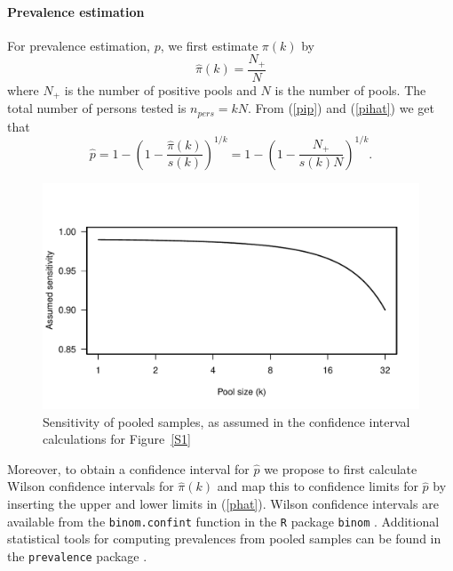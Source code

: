 \documentclass[10pt]{article}
\begin{document}
\paragraph*{Prevalence estimation}
For prevalence estimation, $p$,  we first  estimate $\pi(k)$ by 
\begin{equation}
\label{pihat}
\hat{\pi}(k)=\frac{N_{+}}{N}
\end{equation}
where $N_{+}$  is the number of positive pools and $N$ is the number of pools.  The total number of persons tested is $n_{pers}=kN$. From (\ref{pip})  and (\ref{pihat}) we get that 
\begin{equation}
\label{phat}
\hat{p}=1-\left(1-\frac{\hat{\pi}(k)}{s(k)}\right)^{1/k}=1-\left(1-\frac{N_+}{s(k)N}\right)^{1/k}.
\end{equation}
\begin{figure}[!hbt]
\begin{center}
\includegraphics[width=0.85\linewidth]{sens_assumed.pdf}
\end{center}
\caption{Sensitivity of pooled samples, as assumed in the confidence interval calculations for Figure~\ref{S1}}
\label{S3}
\end{figure}
Moreover, to obtain a confidence interval for $\hat p$ we propose to first calculate Wilson confidence intervals \cite{agresti_approximate_1998} for $\hat{\pi}(k)$ and map this to confidence limits for $\hat p$ by inserting the upper and lower limits in (\ref{phat}). Wilson confidence intervals are available from the {\tt binom.confint} function in the {\tt R} package {\tt binom} \cite{R,binom}. Additional statistical tools for computing prevalences from pooled samples can be found in the {\tt prevalence} package \cite{prevalence,speybroeck_estimating_2012}.
\end{document}
